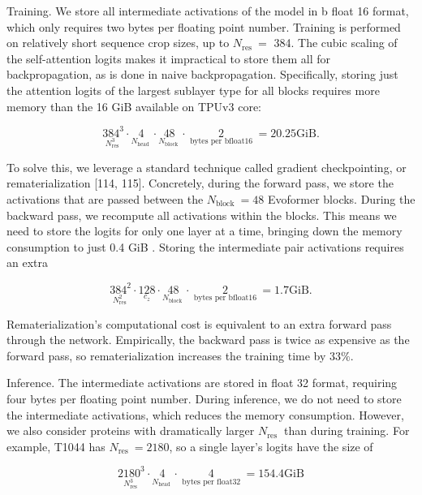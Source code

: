 \documentclass[10pt]{article}
\begin{document}
Training. We store all intermediate activations of the model in b float 16 format, which only requires two bytes per floating point number. Training is performed on relatively short sequence crop sizes, up to $N_{\text {res }}=$ 384. The cubic scaling of the self-attention logits makes it impractical to store them all for backpropagation, as is done in naive backpropagation. Specifically, storing just the attention logits of the largest sublayer type for all blocks requires more memory than the 16 GiB available on TPUv3 core:


\begin{equation*}
\underset{N_{\text {res }}^{3}}{384^{3}} \cdot \underset{N_{\text {head }}}{4} \cdot \underset{N_{\text {block }}}{48} \cdot \underset{\text { bytes per bfloat16 }}{2}=20.25 \mathrm{GiB} . \tag{49}
\end{equation*}


To solve this, we leverage a standard technique called gradient checkpointing, or rematerialization [114, 115]. Concretely, during the forward pass, we store the activations that are passed between the $N_{\text {block }}=48$ Evoformer blocks. During the backward pass, we recompute all activations within the blocks. This means we need to store the logits for only one layer at a time, bringing down the memory consumption to just 0.4 GiB . Storing the intermediate pair activations requires an extra


\begin{equation*}
\underset{N_{\text {res }}^{2}}{384^{2}} \cdot \underset{c_{z}}{128} \cdot \underset{N_{\text {block }}}{48} \cdot \underset{\text { bytes per bfloat16 }}{2}=1.7 \mathrm{GiB} . \tag{50}
\end{equation*}


Rematerialization's computational cost is equivalent to an extra forward pass through the network. Empirically, the backward pass is twice as expensive as the forward pass, so rematerialization increases the training time by $33 \%$.

Inference. The intermediate activations are stored in float 32 format, requiring four bytes per floating point number. During inference, we do not need to store the intermediate activations, which reduces the memory consumption. However, we also consider proteins with dramatically larger $N_{\text {res }}$ than during training. For example, T1044 has $N_{\text {res }}=2180$, so a single layer's logits have the size of


\begin{equation*}
\underset{N_{\text {res }}^{3}}{2180^{3}} \cdot \underset{N_{\text {head }}}{4} \cdot \underset{\text { bytes per float32 }}{4}=154.4 \mathrm{GiB} \tag{51}
\end{equation*}
\end{document}
